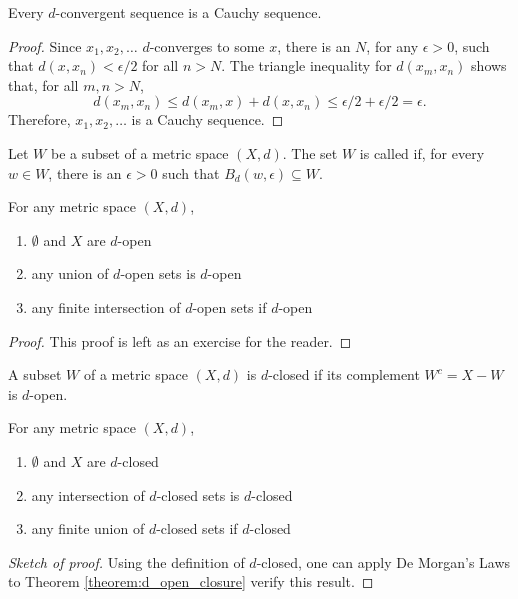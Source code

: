 \begin{theorem}
Every $d$-convergent sequence is a Cauchy sequence.
\end{theorem}
\begin{proof}
Since $x_1,x_2,\ldots$ $d$-converges to some $x$, there is an $N$, for any $\epsilon>0$, such that $d(x,x_n)<\epsilon /2$ for all $n>N$.
The triangle inequality for $d(x_m,x_n)$ shows that, for all $m,n>N$,
\[ d(x_m,x_n)\leq d(x_m,x) + d(x,x_n) \leq \epsilon/2 + \epsilon/2 = \epsilon. \]
Therefore, $x_1,x_2,\ldots$ is a Cauchy sequence.
\end{proof}

\begin{definition}
Let $W$ be a subset of a metric space $(X,d)$.
The set $W$ is called  if, for every $w\in W$, there is an $\epsilon>0$ such that $B_d (w,\epsilon) \subseteq W$.
\end{definition}

\begin{theorem}
\label{theorem:d_open_closure}
For any metric space $(X,d)$,
\begin{enumerate}
\item $\emptyset$ and $X$ are $d$-open
\item any union of $d$-open sets is $d$-open
\item any finite intersection of $d$-open sets if $d$-open
\end{enumerate}
\end{theorem}
\begin{proof}
This proof is left as an exercise for the reader.
\end{proof}

\begin{definition}
A subset $W$ of a metric space $(X,d)$ is $d$-closed if its complement $W^c = X-W$ is $d$-open.
\end{definition}

\begin{corollary}
For any metric space $(X,d)$,
\begin{enumerate}
\item $\emptyset$ and $X$ are $d$-closed
\item any intersection of $d$-closed sets is $d$-closed
\item any finite union of $d$-closed sets if $d$-closed
\end{enumerate}
\end{corollary}
\begin{proof}[Sketch of proof]
Using the definition of $d$-closed, one can apply De Morgan's Laws to Theorem \ref{theorem:d_open_closure} verify this result.
\end{proof}

